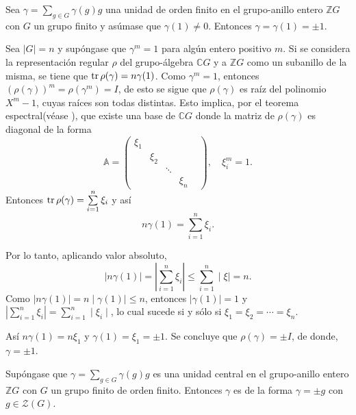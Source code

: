 \begin{lema}\label{lem:BH}
Sea $\gamma = \sum_{g \in G}\gamma(g)g$ una unidad de orden finito en el grupo-anillo entero  $\mathds{Z}G$ con $G$ un grupo finito y asúmase que $\gamma(1)\neq 0$. Entonces $\gamma = \gamma(1) = \pm 1.$
\end{lema}
\begin{proof*}
Sea $|G| = n$ y supóngase que $\gamma^{m} = 1$ para algún entero positivo $m$. Si se considera la representación regular $\rho$ del grupo-álgebra $\mathds{C}G$ y a $\mathds{Z}G$ como un subanillo de la misma, se tiene que $\operatorname{tr}\rho(\gamma) = n\gamma(1)$.
Como $\gamma^{m} = 1$, entonces $\left( \rho(\gamma) \right)^m = \rho(\gamma^{m}) = I$, de esto se sigue que $\rho(\gamma)$ es raíz del polinomio $X^m-1$, cuyas raíces son todas distintas. Esto implica, por el teorema espectral(véase \cite[p 214]{bib:lang}), que existe una base de $\mathds{C}G$ donde la matriz de $\rho(\gamma)$ es diagonal de la forma
\begin{equation*}
\mathds{A} = \begin{pmatrix}
\xi_1 & & & &\\
 & \xi_2 & & \\
 & & \ddots & \\
  & & & \xi_n
\end{pmatrix}, \quad \xi_i^m = 1.
\end{equation*}
 Entonces $\operatorname{tr}\rho(\gamma) = \sum\limits_{i = 1}^{n}\xi_i$ y así
 \begin{equation*}
 n\gamma(1) = \sum\limits_{i =1}^{n}\xi_i.
 \end{equation*}
 
 Por lo tanto, aplicando valor absoluto,
 \begin{equation*}
 \mid n\gamma(1) \mid = \left| \sum_{i = 1}^{n}\xi_i \right| \leq \sum_{i = 1}^{n}\mid \xi \mid = n.
 \end{equation*}
 Como $\mid n\gamma(1)\mid = n\mid\gamma(1)\mid \leq n$, entonces $\mid \gamma(1) \mid = 1$ y $\left| \sum_{i = 1}^{n}\xi_i \right| = \sum\limits_{i = 1}^{n}\mid \xi_i \mid$, lo cual sucede si y sólo si $\xi_1=\xi_2=\cdots = \xi_n$.
 
 Así $n\gamma(1) = n\xi_1$ y $\gamma(1) = \xi_1=\pm 1$. Se concluye que $\rho(\gamma) = \pm I$, de donde, $\gamma = \pm 1$.
\end{proof*}
\begin{corolario}
Supóngase que $\gamma = \sum_{g \in G}\gamma(g)g$ es una unidad central en el grupo-anillo entero $\mathds{Z}G$ con $G$ un grupo finito de orden finito. Entonces $\gamma$ es de la forma $\gamma = \pm g$ con $g \in  \mathcal{Z}(G)$.
\end{corolario}
